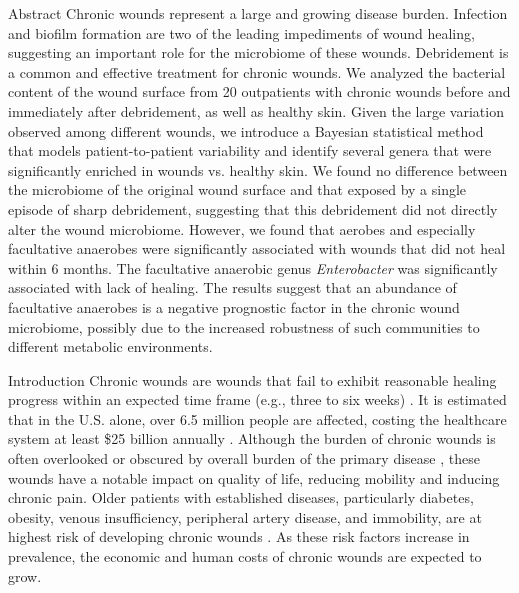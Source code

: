 \documentclass[oneside,12pt,final]{sty/ucthesis-CA2012}
\begin{document}
\begin{mainmatter}
\begin{section}{Abstract}
Chronic wounds represent a large and growing disease burden. Infection and biofilm formation are two of the leading impediments of wound healing, suggesting an important role for the microbiome of these wounds. Debridement is a common and effective treatment for chronic wounds. We analyzed the bacterial content of the wound surface from 20 outpatients with chronic wounds before and immediately after debridement, as well as healthy skin. Given the large variation observed among different wounds, we introduce a Bayesian statistical method that models patient-to-patient variability and identify several genera that were significantly enriched in wounds vs. healthy skin. We found no difference between the microbiome of the original wound surface and that exposed by a single episode of sharp debridement, suggesting that this debridement did not directly alter the wound microbiome. However, we found that aerobes and especially facultative anaerobes were significantly associated with wounds that did not heal within 6 months. The facultative anaerobic genus \textit{Enterobacter} was significantly associated with lack of healing. The results suggest that an abundance of facultative anaerobes is a negative prognostic factor in the chronic wound microbiome, possibly due to the increased robustness of such communities to different metabolic environments.
\end{section}

\begin{section}{Introduction}
Chronic wounds are wounds that fail to exhibit reasonable healing progress within an expected time frame (e.g., three to six weeks) \cite{RN2, RN3}. It is estimated that in the U.S. alone, over 6.5 million people are affected, costing the healthcare system at least \$25 billion annually \cite{RN4}. Although the burden of chronic wounds is often overlooked or obscured by overall burden of the primary disease \cite{RN2, RN3}, these wounds have a notable impact on quality of life, reducing mobility and inducing chronic pain. Older patients with established diseases, particularly diabetes, obesity, venous insufficiency, peripheral artery disease, and immobility, are at highest risk of developing chronic wounds \cite{RN4}. As these risk factors increase in prevalence, the economic and human costs of chronic wounds are expected to grow.


\end{section}
\end{mainmatter}
\end{document}
